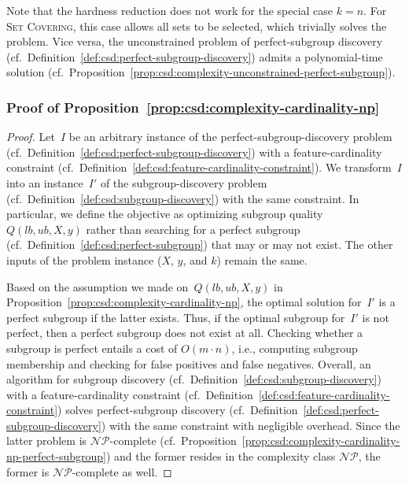 Note that the hardness reduction does not work for the special case $k=n$.
For \textsc{Set Covering}, this case allows all sets to be selected, which trivially solves the problem.
Vice versa, the unconstrained problem of perfect-subgroup discovery (cf.~Definition~\ref{def:csd:perfect-subgroup-discovery}) admits a polynomial-time solution (cf.~Proposition~\ref{prop:csd:complexity-unconstrained-perfect-subgroup}).

\subsubsection{Proof of Proposition~\ref{prop:csd:complexity-cardinality-np}}
\label{sec:appendix:csd:proofs:complexity-cardinality-np}

\begin{proof}
	Let~$I$ be an arbitrary instance of the perfect-subgroup-discovery problem (cf.~Definition~\ref{def:csd:perfect-subgroup-discovery}) with a feature-cardinality constraint (cf.~Definition~\ref{def:csd:feature-cardinality-constraint}).
	We transform~$I$ into an instance~$I'$ of the subgroup-discovery problem (cf.~Definition~\ref{def:csd:subgroup-discovery}) with the same constraint.
	In particular, we define the objective as optimizing subgroup quality~$Q(\mathit{lb}, \mathit{ub}, X, y)$ rather than searching for a perfect subgroup (cf.~Definition~\ref{def:csd:perfect-subgroup}) that may or may not exist.
	The other inputs of the problem instance ($X$, $y$, and $k$) remain the same.
	
	Based on the assumption we made on~$Q(\mathit{lb}, \mathit{ub}, X, y)$ in Proposition~\ref{prop:csd:complexity-cardinality-np}, the optimal solution for~$I'$ is a perfect subgroup if the latter exists.
	Thus, if the optimal subgroup for~$I'$ is not perfect, then a perfect subgroup does not exist at all.
	Checking whether a subgroup is perfect entails a cost of $O(m \cdot n)$, i.e., computing subgroup membership and checking for false positives and false negatives.
	Overall, an algorithm for subgroup discovery (cf.~Definition~\ref{def:csd:subgroup-discovery}) with a feature-cardinality constraint (cf.~Definition~\ref{def:csd:feature-cardinality-constraint}) solves perfect-subgroup discovery (cf.~Definition~\ref{def:csd:perfect-subgroup-discovery}) with the same constraint with negligible overhead.
	Since the latter problem is $\mathcal{NP}$-complete (cf.~Proposition~\ref{prop:csd:complexity-cardinality-np-perfect-subgroup}) and the former resides in the complexity class $\mathcal{NP}$, the former is $\mathcal{NP}$-complete as well.
\end{proof}
